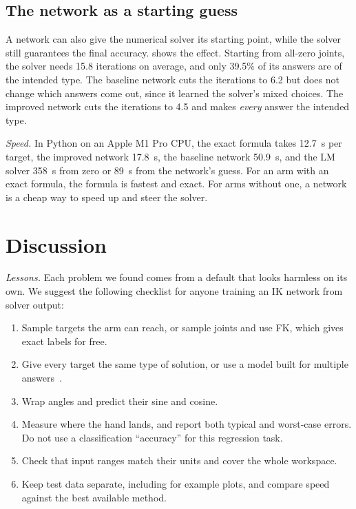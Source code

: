 \documentclass[conference]{IEEEtran}
\begin{document}
\subsection{The network as a starting guess}
A network can also give the numerical solver its starting point, while the solver still guarantees the final accuracy.  shows the effect. Starting from all-zero joints, the solver needs 15.8 iterations on average, and only 39.5\% of its answers are of the intended type. The baseline network cuts the iterations to 6.2 but does not change which answers come out, since it learned the solver's mixed choices. The improved network cuts the iterations to 4.5 and makes \emph{every} answer the intended type.

\emph{Speed.} In Python on an Apple M1 Pro CPU, the exact formula takes 12.7~\textmu s per target, the improved network 17.8~\textmu s, the baseline network 50.9~\textmu s, and the LM solver 358~\textmu s from zero or 89~\textmu s from the network's guess. For an arm with an exact formula, the formula is fastest and exact. For arms without one, a network is a cheap way to speed up and steer the solver.

\section{Discussion}

\emph{Lessons.} Each problem we found comes from a default that looks harmless on its own. We suggest the following checklist for anyone training an IK network from solver output:
\begin{enumerate}[label=\arabic*.]
\item Sample targets the arm can reach, or sample joints and use FK, which gives exact labels for free.
\item Give every target the same type of solution, or use a model built for multiple answers~\cite{bishop1994mixture,ames2022ikflow}.
\item Wrap angles and predict their sine and cosine.
\item Measure where the hand lands, and report both typical and worst-case errors. Do not use a classification ``accuracy'' for this regression task.
\item Check that input ranges match their units and cover the whole workspace.
\item Keep test data separate, including for example plots, and compare speed against the best available method.
\end{enumerate}
\end{document}
